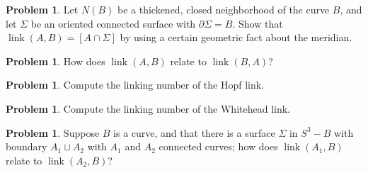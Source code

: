 \documentclass[12pt]{handout}
\theoremstyle{definition}
\newtheorem{problem}[theorem]{Problem}
\DeclareMathOperator{\link}{link}
\begin{document}
\begin{problem}
  Let $N(B)$ be a thickened, closed neighborhood of the curve $B$, and
  let $\Sigma$ be an oriented connected surface with $\partial \Sigma
  = B$.  Show that $\link(A,B) = [A \cap \Sigma]$ by using a certain
  geometric fact about the meridian.
\end{problem}

\begin{problem}
  How does $\link(A,B)$ relate to $\link(B,A)$?
\end{problem}

\begin{problem}
  Compute the linking number of the Hopf link.
\end{problem}

\begin{problem}
  Compute the linking number of the Whitehead link.
\end{problem}

\begin{problem}
  Suppose $B$ is a curve, and that there is a surface $\Sigma$ in $S^3
  - B$ with boundary $A_1 \sqcup A_2$ with $A_1$ and $A_2$ connected
  curves; how does $\link(A_1,B)$ relate to $\link(A_2,B)$?
\end{problem}

\pagebreak
\null
\end{document}
